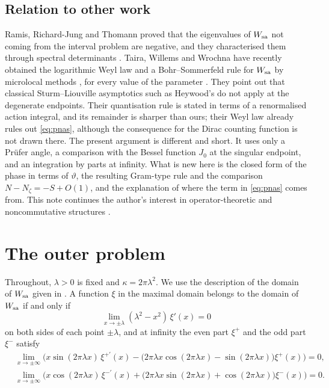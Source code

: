 \documentclass[11pt]{amsart}
\theoremstyle{definition}
\begin{document}
\subsection*{Relation to other work}
Ramis, Richard-Jung and Thomann proved that the eigenvalues of $W_{\rm sa}$ not coming from the interval problem are negative, and they characterised them through spectral determinants \cite{RRT25}. Taira, Willems and Wrochna have recently obtained the logarithmic Weyl law and a Bohr--Sommerfeld rule for $W_{\rm sa}$ by microlocal methods \cite{TWW26}, for every value of the parameter \cite[Remark~1.4]{TWW26}. They point out that classical Sturm--Liouville asymptotics such as Heywood's do not apply at the degenerate endpoints. Their quantisation rule is stated in terms of a renormalised action integral, and its remainder is sharper than ours; their Weyl law already rules out \eqref{eq:pnas}, although the consequence for the Dirac counting function is not drawn there. The present argument is different and short. It uses only a Pr\"ufer angle, a comparison with the Bessel function $J_0$ at the singular endpoint, and an integration by parts at infinity. What is new here is the closed form of the phase in terms of $\vartheta$, the resulting Gram-type rule and the comparison $N-N_\zeta=-S+O(1)$, and the explanation of where the term in \eqref{eq:pnas} comes from. This note continues the author's interest in operator-theoretic and noncommutative structures \cite{Bha22a,Bha22b,BSN26}.

\section{The outer problem}\label{sec:outer}

Throughout, $\lambda>0$ is fixed and $\kappa=2\pi\lambda^2$. We use the description of the domain of $W_{\rm sa}$ given in \cite[\S2]{CM21}. A function $\xi$ in the maximal domain belongs to the domain of $W_{\rm sa}$ if and only if
\begin{equation}\label{eq:bc0}
\lim_{x\to\pm\lambda}(\lambda^2-x^2)\,\xi'(x)=0
\end{equation}
on both sides of each point $\pm\lambda$, and at infinity the even part $\xi^+$ and the odd part $\xi^-$ satisfy
\begin{align}
&\lim_{x\to\pm\infty}\Big(x\sin(2\pi\lambda x)\,\xi^{+\prime}(x)-\big(2\pi\lambda x\cos(2\pi\lambda x)-\sin(2\pi\lambda x)\big)\xi^+(x)\Big)=0,\label{eq:bcplus}\\
&\lim_{x\to\pm\infty}\Big(x\cos(2\pi\lambda x)\,\xi^{-\prime}(x)+\big(2\pi\lambda x\sin(2\pi\lambda x)+\cos(2\pi\lambda x)\big)\xi^-(x)\Big)=0.\label{eq:bcminus}
\end{align}
\end{document}

